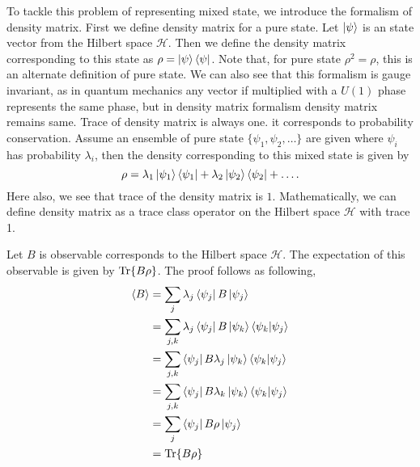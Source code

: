 \documentclass{amsart}
\theoremstyle{plain}
\theoremstyle{definition}
\theoremstyle{plain}
\begin{document}
To tackle this problem of representing mixed state, we introduce the formalism of density matrix. First we define density matrix for a pure state. Let $\ket{\psi}$ is an state vector from the Hilbert space $\mathcal{H}$. Then we define the density matrix corresponding to this state as $\rho = \ket{\psi} \bra{\psi}$. Note that, for pure state $\rho^2 = \rho$, this is an alternate definition of pure state. We can also see that this formalism is gauge invariant, as in quantum mechanics any vector if multiplied with a $U(1)$ phase represents the same phase, but in density matrix formalism density matrix remains same. Trace of density matrix is always one. it corresponds to probability conservation. Assume an ensemble of pure state $\{\psi_1, \psi_2, \dots\}$ are given where $\psi_i$ has probability $\lambda_i$, then the density corresponding to this mixed state is given by 
\begin{equation*}
    \rho = \lambda_1 \ket{\psi_1}\bra{\psi_1} + \lambda_2\ket{\psi_2}\bra{\psi_2} + \dots.
\end{equation*}
Here also, we see that trace of the density matrix is $1$. Mathematically, we can define density matrix as a trace class operator on the Hilbert space $\mathcal{H}$ with trace 1.


Let $B$ is observable corresponds to the Hilbert space $\mathcal{H}$. The expectation of this observable is given by $\Tr{B \rho}$. The proof follows as following,
\begin{align*}
    \langle B \rangle &= \sum_j \lambda_j \bra{\psi_j} B \ket{\psi_j} \\
    &= \sum_{j,k} \lambda_j \bra{\psi_j} B \ket{\psi_k} \bra{\psi_k} \ket{\psi_j} \\
    &= \sum_{j,k} \bra{\psi_j} B \lambda_j \ket{\psi_k} \bra{\psi_k} \ket{\psi_j} \\
    &= \sum_{j,k} \bra{\psi_j} B \lambda_k \ket{\psi_k} \bra{\psi_k} \ket{\psi_j} \\
    &= \sum_{j} \bra{\psi_j} B \rho \ket{\psi_j} \\
    &= \Tr{B \rho}
\end{align*}
\end{document}
